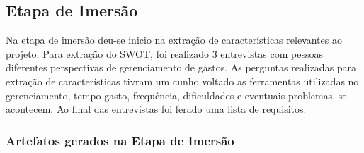 \subsection{Etapa de Imersão}

Na etapa de imersão deu-se inicio na extração de características relevantes ao projeto. Para extração do SWOT, foi realizado 3 entrevistas com pessoas diferentes perspectivas de gerenciamento de gastos. As perguntas realizadas para extração de características tivram um cunho voltado as ferramentas utilizadas no gerenciamento, tempo gasto, frequência, dificuldades e eventuais problemas, se acontecem. Ao final das entrevistas foi ferado uma lista de requisitos.

\subsubsection*{Artefatos gerados na Etapa de Imersão}


